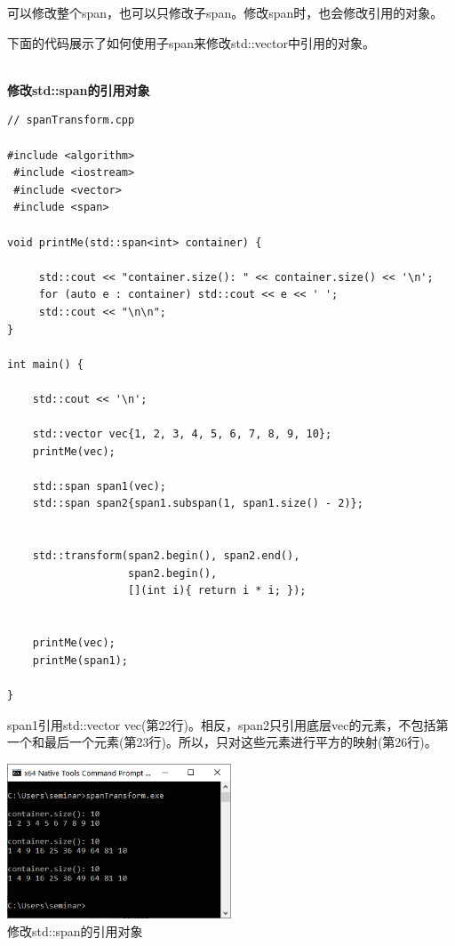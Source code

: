 
可以修改整个span，也可以只修改子span。修改span时，也会修改引用的对象。

下面的代码展示了如何使用子span来修改std::vector中引用的对象。

\hspace*{\fill} \\ %
\noindent
\textbf{修改std::span的引用对象}
\begin{lstlisting}[style=styleCXX]
// spanTransform.cpp

#include <algorithm>
 #include <iostream>
 #include <vector>
 #include <span>

void printMe(std::span<int> container) {
	
	 std::cout << "container.size(): " << container.size() << '\n';
	 for (auto e : container) std::cout << e << ' ';
	 std::cout << "\n\n";
}

int main() {

	std::cout << '\n';
	
	std::vector vec{1, 2, 3, 4, 5, 6, 7, 8, 9, 10};
	printMe(vec);
	
	std::span span1(vec);
	std::span span2{span1.subspan(1, span1.size() - 2)};
	
	
	std::transform(span2.begin(), span2.end(),
	               span2.begin(),
	               [](int i){ return i * i; });
	
	
	printMe(vec);
	printMe(span1);

}
\end{lstlisting}

span1引用std::vector vec(第22行)。相反，span2只引用底层vec的元素，不包括第一个和最后一个元素(第23行)。所以，只对这些元素进行平方的映射(第26行)。

\begin{center}
\includegraphics[width=0.5\textwidth]{content/3/chapter5/images/7.png}\\
修改std::span的引用对象
\end{center}

